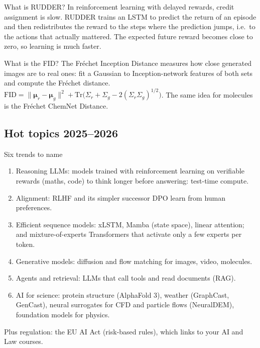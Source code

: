 \begin{qabox}[Hochreiter]{\pred What is RUDDER?}
\ans In reinforcement learning with delayed rewards, credit assignment is slow. RUDDER trains an
LSTM to predict the return of an episode and then redistributes the reward to the steps where the
prediction jumps, i.e.\ to the actions that actually mattered. The expected future reward becomes
close to zero, so learning is much faster.
\end{qabox}

\begin{qabox}[Klambauer]{\pred What is the FID?}
\ans The Fr\'echet Inception Distance measures how close generated images are to real ones: fit
a Gaussian to Inception-network features of both sets and compute the Fr\'echet distance.
\formula $\mathrm{FID}=\lVert\bm\mu_r-\bm\mu_g\rVert^2+\mathrm{Tr}\bigl(\Sigma_r+\Sigma_g-2(\Sigma_r\Sigma_g)^{1/2}\bigr)$.
\follow The same idea for molecules is the Fr\'echet ChemNet Distance.
\end{qabox}

\subsection{Hot topics 2025--2026}

\begin{summary}{Six trends to name}
\begin{enumerate}
\item \textsf{Reasoning LLMs:} models trained with reinforcement learning on verifiable rewards
  (maths, code) to think longer before answering: test-time compute.
\item \textsf{Alignment:} RLHF and its simpler successor DPO learn from human preferences.
\item \textsf{Efficient sequence models:} xLSTM, Mamba (state space), linear attention; and
  mixture-of-experts Transformers that activate only a few experts per token.
\item \textsf{Generative models:} diffusion and flow matching for images, video, molecules.
\item \textsf{Agents and retrieval:} LLMs that call tools and read documents (RAG).
\item \textsf{AI for science:} protein structure (AlphaFold 3), weather (GraphCast, GenCast),
  neural surrogates for CFD and particle flows (NeuralDEM), foundation models for physics.
\end{enumerate}
Plus regulation: the EU AI Act (risk-based rules), which links to your AI and Law courses.
\end{summary}

